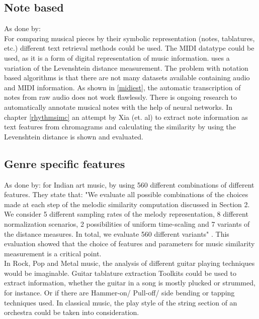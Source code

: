 \subsection{Note based}

As done by: \cite{midi1}\\
For comparing musical pieces by their symbolic representation (notes, tablatures, etc.) different text retrieval methods could be used. The MIDI datatype could be used, as it is a form of digital representation of music information. 
\cite{midi1} uses a variation of the Levenshtein distance measurement. 
The problem with notation based algorithms is that there are not many datasets available containing audio and MIDI information.
As shown in \ref{midiest}, the automatic transcription of notes from raw audio does not work flawlessly. 
There is ongoing research to automatically annotate musical notes with the help of neural networks.\cite{crepe1}
In chapter \ref{rhythmsimc} an attempt by Xia (et. al) \cite{chroma4} to extract note information as text features from chromagrams and calculating the similarity by using the Levenshtein distance is shown and evaluated.

\subsection{Genre specific features}

As done by: \cite{mussim1} for Indian art music, by using 560 different combinations of different features. They state that: "We evaluate all possible combinations of the choices made at each step of the melodic similarity computation discussed in Section 2.  We consider 5 different sampling rates of the melody representation, 8 different normalization scenarios, 2 possibilities of uniform time-scaling and 7 variants of the distance measures.  In total, we evaluate 560 different variants" \cite[p. 3]{mussim1}. This evaluation showed that the choice of features and parameters for music similarity measurement is a critical point.\\
In Rock, Pop and Metal music, the analysis of different guitar playing techniques would be imaginable. Guitar tablature extraction \cite{guitext1} Toolkits could be used to extract information, whether the guitar in a song is mostly plucked or strummed, for instance. Or if there are Hammer-on/ Pull-off/ side bending or tapping techniques used.
In classical music, the play style of the string section of an orchestra could be taken into consideration. 

